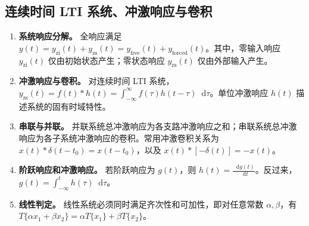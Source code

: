 \documentclass[12pt,a4paper]{ctexart}
\newcommand{\dif}{\mathop{}\!\mathrm{d}}
\begin{document}
\subsection{连续时间 LTI 系统、冲激响应与卷积}
\begin{enumerate}
\item \textbf{系统响应分解。} 全响应满足 \(\displaystyle y(t)=y_{\mathrm{zi}}(t)+y_{\mathrm{zs}}(t)=y_{\mathrm{free}}(t)+y_{\mathrm{forced}}(t)\)。其中，零输入响应 $y_{\mathrm{zi}}(t)$ 仅由初始状态产生；零状态响应 $y_{\mathrm{zs}}(t)$ 仅由外部输入产生。

\item \textbf{冲激响应与卷积。} 对连续时间 LTI 系统，\(\displaystyle y_{\mathrm{zs}}(t)=f(t)*h(t)=\int_{-\infty}^{\infty}f(\tau)h(t-\tau)\dif\tau\)。单位冲激响应 $h(t)$ 描述系统的固有时域特性。

\item \textbf{串联与并联。} 并联系统总冲激响应为各支路冲激响应之和；串联系统总冲激响应为各子系统冲激响应的卷积。常用冲激卷积关系为 \(\displaystyle x(t)*\delta(t-t_0)=x(t-t_0)\)，以及 \(\displaystyle x(t)*[-\delta(t)]=-x(t)\)。

\item \textbf{阶跃响应和冲激响应。} 若阶跃响应为 $g(t)$，则 \(\displaystyle h(t)=\frac{\dif g(t)}{\dif t}\)。反过来，\(\displaystyle g(t)=\int_{-\infty}^{t}h(\tau)\dif\tau\)。

\item \textbf{线性判定。} 线性系统必须同时满足齐次性和可加性，即对任意常数 $\alpha,\beta$，有 \(\displaystyle T\{\alpha x_1+\beta x_2\}=\alpha T\{x_1\}+\beta T\{x_2\}\)。
\end{enumerate}
\end{document}
